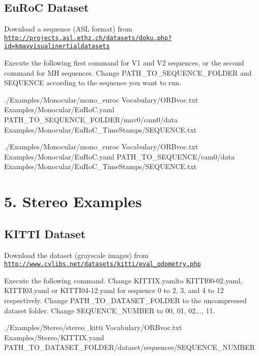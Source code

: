 \subsection*{Eu\+RoC Dataset}


\begin{DoxyEnumerate}
\item Download a sequence (A\+SL format) from \href{http://projects.asl.ethz.ch/datasets/doku.php?id=kmavvisualinertialdatasets}{\tt http\+://projects.\+asl.\+ethz.\+ch/datasets/doku.\+php?id=kmavvisualinertialdatasets}
\item Execute the following first command for V1 and V2 sequences, or the second command for MH sequences. Change P\+A\+T\+H\+\_\+\+T\+O\+\_\+\+S\+E\+Q\+U\+E\+N\+C\+E\+\_\+\+F\+O\+L\+D\+ER and S\+E\+Q\+U\+E\+N\+CE according to the sequence you want to run. 
\begin{DoxyCode}
./Examples/Monocular/mono\_euroc Vocabulary/ORBvoc.txt Examples/Monocular/EuRoC.yaml
       PATH\_TO\_SEQUENCE\_FOLDER/mav0/cam0/data Examples/Monocular/EuRoC\_TimeStamps/SEQUENCE.txt 
\end{DoxyCode}

\end{DoxyEnumerate}


\begin{DoxyCode}
./Examples/Monocular/mono\_euroc Vocabulary/ORBvoc.txt Examples/Monocular/EuRoC.yaml
       PATH\_TO\_SEQUENCE/cam0/data Examples/Monocular/EuRoC\_TimeStamps/SEQUENCE.txt 
\end{DoxyCode}


\section*{5. Stereo Examples}

\subsection*{K\+I\+T\+TI Dataset}


\begin{DoxyEnumerate}
\item Download the dataset (grayscale images) from \href{http://www.cvlibs.net/datasets/kitti/eval_odometry.php}{\tt http\+://www.\+cvlibs.\+net/datasets/kitti/eval\+\_\+odometry.\+php}
\item Execute the following command. Change {\ttfamily K\+I\+T\+T\+I\+X.\+yaml}to K\+I\+T\+T\+I00-\/02.\+yaml, K\+I\+T\+T\+I03.\+yaml or K\+I\+T\+T\+I04-\/12.\+yaml for sequence 0 to 2, 3, and 4 to 12 respectively. Change {\ttfamily P\+A\+T\+H\+\_\+\+T\+O\+\_\+\+D\+A\+T\+A\+S\+E\+T\+\_\+\+F\+O\+L\+D\+ER} to the uncompressed dataset folder. Change {\ttfamily S\+E\+Q\+U\+E\+N\+C\+E\+\_\+\+N\+U\+M\+B\+ER} to 00, 01, 02,.., 11. 
\begin{DoxyCode}
./Examples/Stereo/stereo\_kitti Vocabulary/ORBvoc.txt Examples/Stereo/KITTIX.yaml
       PATH\_TO\_DATASET\_FOLDER/dataset/sequences/SEQUENCE\_NUMBER
\end{DoxyCode}

\end{DoxyEnumerate}

